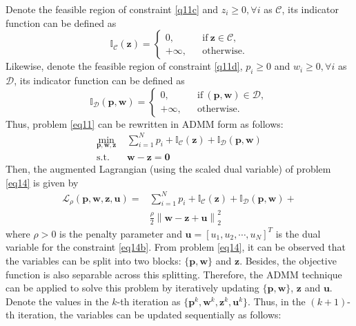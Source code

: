 \documentclass[journal]{IEEEtran}
\begin{document}
Denote the feasible region of constraint \eqref{q11c} and $z_i \geq 0, \forall i$ as $\mathcal{C}$, its indicator function can be defined as
\begin{equation}
\mathbb{I}_\mathcal{C}\left(\mathbf{z}\right) = \left\{ \begin{array}{lcl}
0, & &\mbox{if} \ \mathbf{z} \in \mathcal{C}, \\
+\infty, & &\mbox{otherwise}.
\end{array}
\right.
\end{equation}
Likewise, denote the feasible region of constraint \eqref{q11d}, $p_i\geq 0$ and $w_i \geq 0, \forall i$ as $\mathcal{D}$, its indicator function can be defined as
\begin{equation}
\mathbb{I}_\mathcal{D}\left(\mathbf{p},\mathbf{w}\right) = \left\{ \begin{array}{lcl}
0, & &\mbox{if} \ \left(\mathbf{p}, \mathbf{w}\right) \in \mathcal{D}, \\
+\infty, & &\mbox{otherwise}.
\end{array}
\right.
\end{equation}
Thus, problem \eqref{eq11} can be rewritten in ADMM form as follows:
\begin{subequations}\label{eq14}
	\begin{align}
	\min_{\mathbf{p}, \mathbf{w}, \mathbf{z}}\ & \sum\limits_{i = 1}^{N} p_i + \mathbb{I}_\mathcal{C}\left(\mathbf{z}\right) + \mathbb{I}_\mathcal{D}\left(\mathbf{p},\mathbf{w}\right)  \label{q14a} \\ \mbox{s.t.} \quad &  \mathbf{w} - \mathbf{z} = \mathbf{0} \label{q14b}
	\end{align}
\end{subequations}
Then, the augmented Lagrangian (using the scaled dual variable) of problem \eqref{eq14} is given by
\begin{align}
\mathcal{L}_\rho\left(\mathbf{p},\mathbf{w}, \mathbf{z},\mathbf{u}\right) = & \sum\limits_{i = 1}^{N} p_i + \mathbb{I}_\mathcal{C}\left(\mathbf{z}\right) + \mathbb{I}_\mathcal{D}\left(\mathbf{p},\mathbf{w}\right) +\nonumber \\ & \frac{\rho}{2}\left\|\mathbf{w} - \mathbf{z} + \mathbf{u}\right\|_2^2
\end{align}
where $\rho > 0$ is the penalty parameter and $\mathbf{u} = [u_1, u_2, \cdots, u_N]^T$ is the dual variable for the  constraint \eqref{eq14b}. From problem \eqref{eq14}, it can be observed that the variables can be split into two blocks: $\{\mathbf{p}, \mathbf{w}\}$ and $\mathbf{z}$. Besides, the objective function is also separable across this splitting. Therefore, the ADMM technique can be applied to solve this problem by iteratively updating $\{\mathbf{p}, \mathbf{w}\}$, $\mathbf{z}$ and $\mathbf{u}$. Denote the values in the $k$-th iteration as $\{\mathbf{p}^k, \mathbf{w}^k, \mathbf{z}^k, \mathbf{u}^k\}$. Thus, in the $(k+1)$-th iteration, the variables can be updated sequentially as follows:
 
\end{document}
